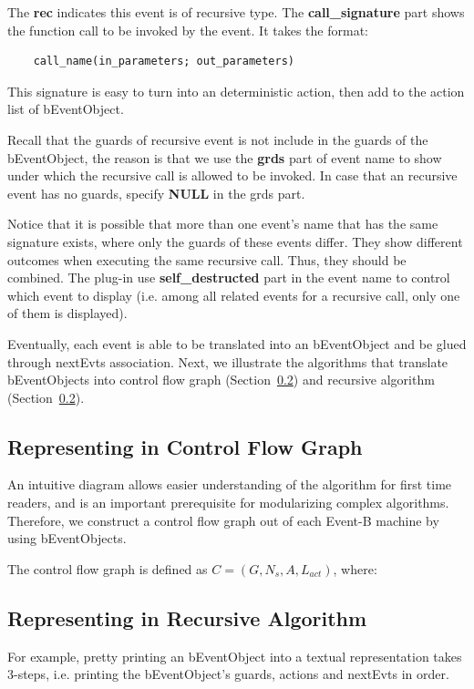 \documentclass{easychair}
\begin{document}
The \textbf{rec} indicates this event is of recursive type. The \textbf{call\_signature} part shows the function call to be invoked by the event. It takes the format:
\lstset{language=[68]Algol}
\begin{lstlisting}
	call_name(in_parameters; out_parameters)
\end{lstlisting} 
This signature is easy to turn into an deterministic action, then add to the action list of bEventObject. 

Recall that the guards of recursive event is not include in the guards of the bEventObject, the reason is that we use the \textbf{grds} part of event name to show under which the recursive call is allowed to be invoked. In case that an recursive event has no guards, specify \textbf{NULL} in the grds part. 

Notice that it is possible that more than one event's name that has the same signature exists, where only the guards of these events differ. They show different outcomes when executing the same recursive call. Thus, they should be combined. The plug-in use \textbf{self\_destructed} part in the event name to control which event to display (i.e. among all related events for a recursive call, only one of them is displayed). 

Eventually, each event is able to be translated into an bEventObject and be glued through nextEvts association. Next, we illustrate the algorithms that translate bEventObjects into control flow graph (Section~\ref{}) and recursive algorithm (Section~\ref{}).


\subsection{Representing in Control Flow Graph} 
An intuitive diagram allows easier understanding of the algorithm for first time readers, and is an important prerequisite for modularizing complex algorithms. Therefore, we construct a control flow graph out of each Event-B machine by using bEventObjects.

The control flow graph is defined as $C = (G, N_{s}, A, L_{act})$, where:




\subsection{Representing in Recursive Algorithm}

For example, pretty printing an bEventObject into a textual representation takes 3-steps, i.e. printing the bEventObject's guards, actions and nextEvts in order.
\end{document}
